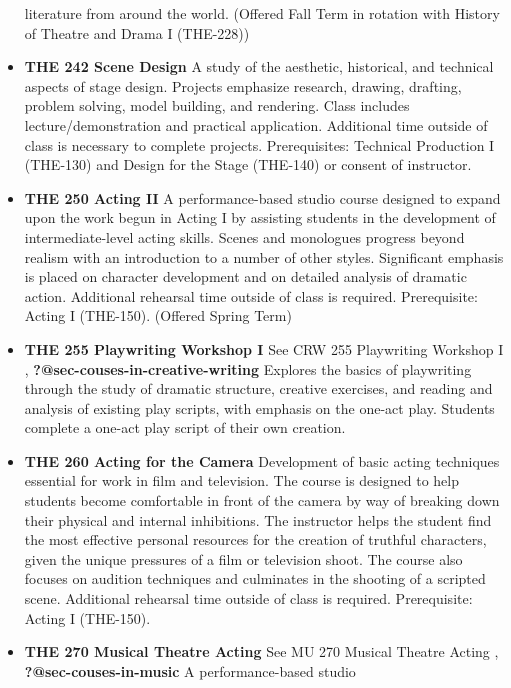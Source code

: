 \documentclass[
  letterpaper,
]{scrbook}
\begin{document}
\begin{itemize}
  literature from around the world. (Offered Fall Term in rotation with
  History of Theatre and Drama I (THE-228))\\
\item
  \textbf{THE 242 Scene Design} A study of the aesthetic, historical,
  and technical aspects of stage design. Projects emphasize research,
  drawing, drafting, problem solving, model building, and rendering.
  Class includes lecture/demonstration and practical application.
  Additional time outside of class is necessary to complete projects.
  Prerequisites: Technical Production I (THE-130) and Design for the
  Stage (THE-140) or consent of instructor.
\item
  \textbf{THE 250 Acting II} A performance-based studio course designed
  to expand upon the work begun in Acting I by assisting students in the
  development of intermediate-level acting skills. Scenes and monologues
  progress beyond realism with an introduction to a number of other
  styles. Significant emphasis is placed on character development and on
  detailed analysis of dramatic action. Additional rehearsal time
  outside of class is required. Prerequisite: Acting I (THE-150).
  (Offered Spring Term)\\
\item
  \textbf{THE 255 Playwriting Workshop I} See CRW 255 Playwriting
  Workshop I , \textbf{?@sec-couses-in-creative-writing} Explores the
  basics of playwriting through the study of dramatic structure,
  creative exercises, and reading and analysis of existing play scripts,
  with emphasis on the one-act play. Students complete a one-act play
  script of their own creation.
\item
  \textbf{THE 260 Acting for the Camera} Development of basic acting
  techniques essential for work in film and television. The course is
  designed to help students become comfortable in front of the camera by
  way of breaking down their physical and internal inhibitions. The
  instructor helps the student find the most effective personal
  resources for the creation of truthful characters, given the unique
  pressures of a film or television shoot. The course also focuses on
  audition techniques and culminates in the shooting of a scripted
  scene. Additional rehearsal time outside of class is required.
  Prerequisite: Acting I (THE-150).\\
\item
  \textbf{THE 270 Musical Theatre Acting} See MU 270 Musical Theatre
  Acting , \textbf{?@sec-couses-in-music} A performance-based studio

\end{itemize}
\end{document}
